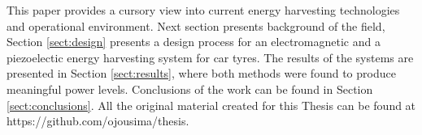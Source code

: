 This paper provides a cursory view into current energy harvesting technologies and operational environment. Next section presents background of the field, Section \ref{sect:design} presents a design process for an electromagnetic and a piezoelectic energy harvesting system for car tyres. The results of the systems are presented in Section \ref{sect:results}, where both methods were found to produce meaningful power levels. Conclusions of the work can be found in Section \ref{sect:conclusions}. All the original material created for this Thesis can be found at https://github.com/ojousima/thesis. 
